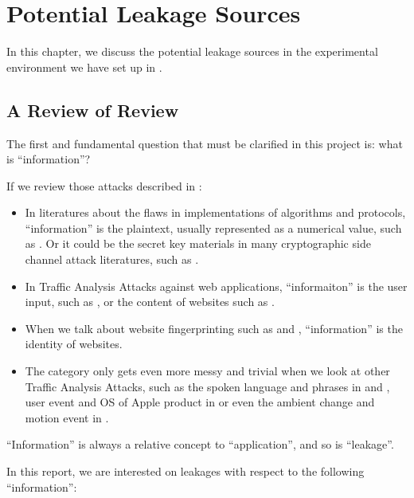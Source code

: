 \chapter{Potential Leakage Sources}

In this chapter, we discuss the potential leakage sources in the experimental environment we have set up in . 

\section{A Review of Review} \label{Sec: A Review of Review}

The first and fundamental question that must be clarified in this project is: what is ``information''?

If we review those attacks described in :

\begin{itemize}
	\item In literatures about the flaws in implementations of algorithms and protocols, ``information'' is the plaintext, usually represented as a numerical value, such as \cite{802154sec} \cite{rfc7457} \cite{CompressionRatioAttack} \cite{PaddingOracle}. Or it could be the secret key materials in many cryptographic side channel attack literatures, such as \cite{DPA}.
	\item In Traffic Analysis Attacks against web applications, ``informaiton'' is the user input, such as \cite{PinpointWeb} \cite{SearchAttack}, or the content of websites such as \cite{WebSideChannel}.
	\item When we talk about website fingerprinting such as \cite{WebsiteFingerprint} \cite{Peekaboo} and \cite{PClassifier}, ``information'' is the identity of websites. 
	\item The category only gets even more messy and trivial when we look at other Traffic Analysis Attacks, such as the spoken language and phrases in \cite{VoIPLanguage} and \cite{VoIPPhrases}, user event and OS of Apple product in \cite{AppleMessage} or even the ambient change and motion event in \cite{Video}.
\end{itemize}

``Information'' is always a relative concept to ``application'', and so is ``leakage''. 

In this report, we are interested on leakages with respect to the following ``information'':

